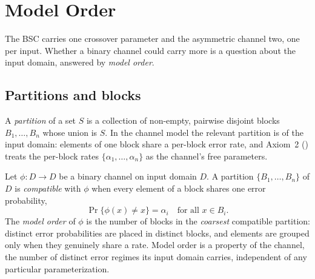%
%
%
%

\section{Model Order}
\label{sec:model-order}

The BSC carries one crossover parameter and the asymmetric channel two, one per
input. Whether a binary channel could carry more is a question about the input
domain, answered by \emph{model order}.

\subsection*{Partitions and blocks}

A \emph{partition} of a set $S$ is a collection of non-empty, pairwise disjoint
blocks $B_1, \ldots, B_n$ whose union is $S$. In the channel model the relevant
partition is of the input domain: elements of one block share a per-block error
rate, and Axiom~2 () treats the per-block rates $\{\alpha_1,
\ldots, \alpha_n\}$ as the channel's free parameters.

\begin{definition}
\label{def:model-order}
Let $\phi : D \to D$ be a binary channel on input domain $D$. A partition
$\{B_1, \ldots, B_n\}$ of $D$ is \emph{compatible} with $\phi$ when every
element of a block shares one error probability,
\[
  \Pr\{\phi(x) \neq x\} = \alpha_i \quad \text{for all } x \in B_i.
\]
The \emph{model order} of $\phi$ is the number of blocks in the \emph{coarsest}
compatible partition: distinct error probabilities are placed in distinct
blocks, and elements are grouped only when they genuinely share a rate. Model
order is a property of the channel, the number of distinct error regimes its
input domain carries, independent of any particular parameterization.
\end{definition}

